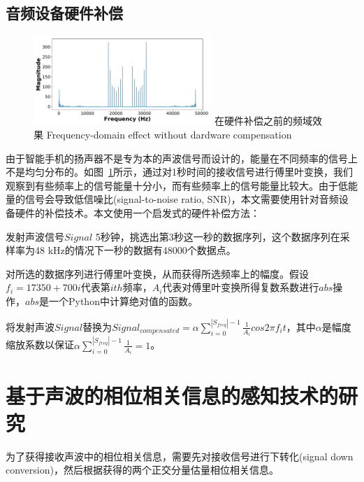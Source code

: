 \subsection{音频设备硬件补偿}

\begin{figure}[!htp]
  \centering
  \includegraphics[width=0.6\textwidth]{figure/nocompensation.pdf}
  \bicaption
    {在硬件补偿之前的频域效果}
    {Frequency-domain effect without dardware compensation}
  \label{fig:nocompensation}
\end{figure}

由于智能手机的扬声器不是专为本的声波信号而设计的，能量在不同频率的信号上不是均匀分布的。如图~\ref{fig:nocompensation}所示，通过对1秒时间的接收信号进行傅里叶变换，我们观察到有些频率上的信号能量十分小，而有些频率上的信号能量比较大。由于低能量的信号会导致低信噪比(signal-to-noise ratio, SNR)，本文需要使用针对音频设备硬件的补偿技术。本文使用一个启发式的硬件补偿方法：
\begin{enumerate*}[label=(\arabic*)]
    \item 发射声波信号$Signal$ 5秒钟，挑选出第3秒这一秒的数据序列，这个数据序列在采样率为48 kHz的情况下一秒的数据有48000个数据点。
    \item 对所选的数据序列进行傅里叶变换，从而获得所选频率上的幅度。假设$f_{i} = 17350 + 700i$代表第$ith$频率，$A_{i}$代表对傅里叶变换所得复数系数进行$abs$操作，$abs$是一个Python中计算绝对值的函数。
    \item 将发射声波$Signal$替换为$Signal_{compensated}=\alpha \sum_{i=0}^{|S_{freq}|-1} \frac{1}{A_i} cos 2\pi f_{i}t$，其中$\alpha$是幅度缩放系数以保证$\alpha \sum_{i=0}^{|S_{freq}|-1}\frac{1}{A_i}=1$。
\end{enumerate*}




\section{基于声波的相位相关信息的感知技术的研究}
为了获得接收声波中的相位相关信息，需要先对接收信号进行下转化(signal down conversion)，然后根据获得的两个正交分量估量相位相关信息。

